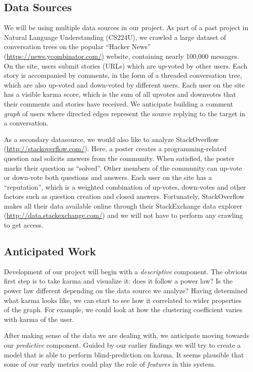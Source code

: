 \documentclass[10pt]{article}
\begin{document}
\subsection{Data Sources}
We will be using multiple data sources in our project. As part of a past
project in Natural Language Understanding (CS224U), we crawled a large dataset
of conversation trees on the popular ``Hacker News''
(\url{https://news.ycombinator.com/}) website, containing nearly 100,000
messages. On the site, users submit stories (URLs) which are up-voted by other
users. Each story is accompanied by comments, in the form of a threaded
conversation tree, which are also up-voted and down-voted by different users.
Each user on the site has a visible karma score, which is the sum of all
upvotes and downvotes that their comments and stories have received.  We
anticipate building a comment \textit{graph} of users where directed edges
represent the source replying to the target in a conversation.

As a secondary datasource, we would also like to analyze StackOverflow
(\url{http://stackoverflow.com/}). Here, a poster creates a programming-related
question and solicits answers from the community. When satisfied, the poster
marks their question as ``solved''. Other members of the community can up-vote
or down-vote both questions and answers. Each user on the site has a
``reputation'', which is a weighted combination of up-votes, down-votes and
other factors such as question creation and closed answers. Fortunately,
StackOverflow makes all their data available online through their StackExchange
data explorer (\url{http://data.stackexchange.com/}) and we will not have to
perform any crawling to get access.

\subsection{Anticipated Work}
Development of our project will begin with a \textit{descriptive} component. The
obvious first step is to take karma and visualize it: does it follow a power
law?  Is the power law different depending on the data source we analyze? Having
determined what karma looks like, we can start to see how it correlated to wider
properties of the graph. For example, we could look at how the clustering
coefficient varies with karma of the user.

After making sense of the data we are dealing with, we anticipate moving towards
our \textit{predictive} component. Guided by our earlier findings we will try to
create a model that is able to perform blind-prediction on karma. It seems
plausible that some of our early metrics could play the role of
\textit{features} in this system.
\end{document}
